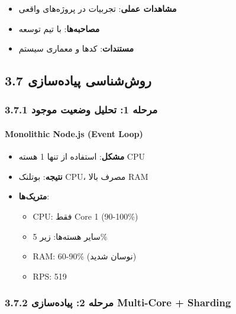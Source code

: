 \documentclass[
]{article}
\providecommand{\tightlist}{%
  \setlength{\itemsep}{0pt}\setlength{\parskip}{0pt}}
\begin{document}
\begin{itemize}
\tightlist
\item
  \textbf{مشاهدات عملی}: تجربیات در پروژه‌های واقعی
\item
  \textbf{مصاحبه‌ها}: با تیم توسعه
\item
  \textbf{مستندات}: کدها و معماری سیستم
\end{itemize}

\subsection{3.7 روش‌شناسی
پیاده‌سازی}\label{ux631ux648ux634ux634ux646ux627ux633ux6cc-ux67eux6ccux627ux62fux647ux633ux627ux632ux6cc}

\subsubsection{3.7.1 مرحله 1: تحلیل وضعیت
موجود}\label{ux645ux631ux62dux644ux647-1-ux62aux62dux644ux6ccux644-ux648ux636ux639ux6ccux62a-ux645ux648ux62cux648ux62f}

\paragraph{Monolithic Node.js (Event
Loop)}\label{monolithic-node.js-event-loop}

\begin{itemize}
\tightlist
\item
  \textbf{مشکل}: استفاده از تنها 1 هسته CPU
\item
  \textbf{نتیجه}: بوتلنک CPU، مصرف بالا RAM
\item
  \textbf{متریک‌ها}:

  \begin{itemize}
  \tightlist
  \item
    CPU: فقط Core 1 (90-100\%)
  \item
    سایر هسته‌ها: زیر 5\%
  \item
    RAM: 60-90\% (نوسان شدید)
  \item
    RPS: 519
  \end{itemize}
\end{itemize}

\subsubsection{3.7.2 مرحله 2: پیاده‌سازی Multi-Core +
Sharding}\label{ux645ux631ux62dux644ux647-2-ux67eux6ccux627ux62fux647ux633ux627ux632ux6cc-multi-core-sharding}
\end{document}
